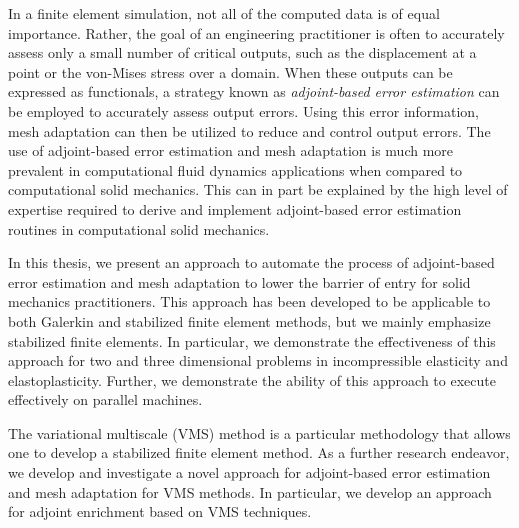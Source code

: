 
In a finite element simulation, not all of the computed
data is of equal importance. Rather, the goal of an engineering
practitioner is often to accurately assess only a small
number of critical outputs, such as the displacement
at a point or the von-Mises stress over a domain. When
these outputs can be expressed as functionals,
a strategy known as \emph{adjoint-based error estimation}
can be employed to accurately assess output errors.
Using this error information, mesh adaptation can then
be utilized to reduce and control output errors.
The use of adjoint-based error estimation and mesh adaptation
is much more prevalent in computational fluid dynamics
applications when compared to computational solid mechanics.
This can in part be explained by the high level of expertise
required to derive and implement adjoint-based error estimation
routines in computational solid mechanics.

In this thesis, we present an approach to automate
the process of adjoint-based error estimation and mesh
adaptation to lower the barrier of entry for solid
mechanics practitioners. This approach has been developed
to be applicable to both Galerkin and stabilized finite
element methods, but we mainly emphasize stabilized finite
elements. In particular, we demonstrate the
effectiveness of this approach for two and three
dimensional problems in incompressible elasticity and
elastoplasticity. Further, we demonstrate the ability
of this approach to execute effectively on parallel
machines.

The variational multiscale (VMS) method is a particular
methodology that allows one to develop a stabilized
finite element method. As a further research endeavor,
we develop and investigate a novel approach for
adjoint-based error estimation and mesh adaptation
for VMS methods. In particular, we develop an approach
for adjoint enrichment based on VMS techniques.

